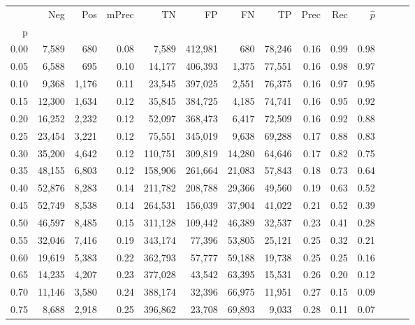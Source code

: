 \begin{tabular}{rrrrrrrrrrrrrr}
\toprule
{} &     Neg &    Pos & mPrec &       TN &       FP &      FN &      TP &  Prec &   Rec & $\hat{p}$ \\
p    &         &        &       &          &          &         &         &       &       &           \\
\midrule
0.00 &   7,589 &    680 &  0.08 &    7,589 &  412,981 &     680 &  78,246 &  0.16 &  0.99 &      0.98 \\
0.05 &   6,588 &    695 &  0.10 &   14,177 &  406,393 &   1,375 &  77,551 &  0.16 &  0.98 &      0.97 \\
0.10 &   9,368 &  1,176 &  0.11 &   23,545 &  397,025 &   2,551 &  76,375 &  0.16 &  0.97 &      0.95 \\
0.15 &  12,300 &  1,634 &  0.12 &   35,845 &  384,725 &   4,185 &  74,741 &  0.16 &  0.95 &      0.92 \\
0.20 &  16,252 &  2,232 &  0.12 &   52,097 &  368,473 &   6,417 &  72,509 &  0.16 &  0.92 &      0.88 \\
0.25 &  23,454 &  3,221 &  0.12 &   75,551 &  345,019 &   9,638 &  69,288 &  0.17 &  0.88 &      0.83 \\
0.30 &  35,200 &  4,642 &  0.12 &  110,751 &  309,819 &  14,280 &  64,646 &  0.17 &  0.82 &      0.75 \\
0.35 &  48,155 &  6,803 &  0.12 &  158,906 &  261,664 &  21,083 &  57,843 &  0.18 &  0.73 &      0.64 \\
0.40 &  52,876 &  8,283 &  0.14 &  211,782 &  208,788 &  29,366 &  49,560 &  0.19 &  0.63 &      0.52 \\
0.45 &  52,749 &  8,538 &  0.14 &  264,531 &  156,039 &  37,904 &  41,022 &  0.21 &  0.52 &      0.39 \\
0.50 &  46,597 &  8,485 &  0.15 &  311,128 &  109,442 &  46,389 &  32,537 &  0.23 &  0.41 &      0.28 \\
0.55 &  32,046 &  7,416 &  0.19 &  343,174 &   77,396 &  53,805 &  25,121 &  0.25 &  0.32 &      0.21 \\
0.60 &  19,619 &  5,383 &  0.22 &  362,793 &   57,777 &  59,188 &  19,738 &  0.25 &  0.25 &      0.16 \\
0.65 &  14,235 &  4,207 &  0.23 &  377,028 &   43,542 &  63,395 &  15,531 &  0.26 &  0.20 &      0.12 \\
0.70 &  11,146 &  3,580 &  0.24 &  388,174 &   32,396 &  66,975 &  11,951 &  0.27 &  0.15 &      0.09 \\
0.75 &   8,688 &  2,918 &  0.25 &  396,862 &   23,708 &  69,893 &   9,033 &  0.28 &  0.11 &      0.07 \\

\end{tabular}
